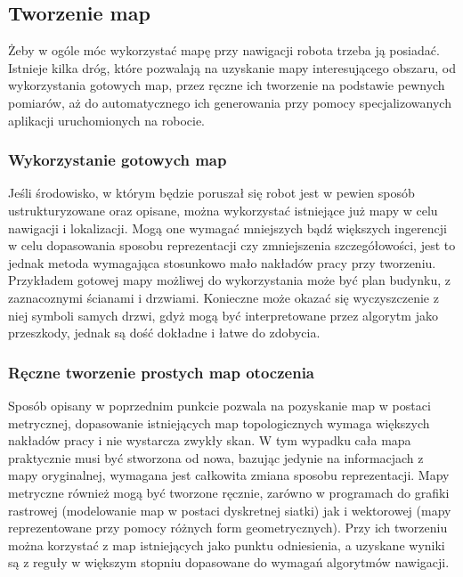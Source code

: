 \subsection{Tworzenie map}

Żeby w ogóle móc wykorzystać mapę przy nawigacji robota trzeba ją posiadać.
Istnieje kilka dróg, które pozwalają na uzyskanie mapy interesującego obszaru,
od wykorzystania gotowych map, przez ręczne ich tworzenie na podstawie pewnych
pomiarów, aż do automatycznego ich generowania przy pomocy specjalizowanych
aplikacji uruchomionych na robocie.

\subsubsection{Wykorzystanie gotowych map}

Jeśli środowisko, w którym będzie poruszał się robot jest w pewien sposób
ustrukturyzowane oraz opisane, można wykorzystać istniejące już mapy w celu
nawigacji i lokalizacji. Mogą one wymagać mniejszych bądź większych ingerencji
w celu dopasowania sposobu reprezentacji czy zmniejszenia szczegółowości,
jest to jednak metoda wymagająca stosunkowo mało nakładów pracy przy tworzeniu.
Przykładem gotowej mapy możliwej do wykorzystania może być plan budynku,
z zaznacoznymi ścianami i drzwiami. Konieczne może okazać się wyczyszczenie
z niej symboli samych drzwi, gdyż mogą być interpretowane przez algorytm
jako przeszkody, jednak są dość dokładne i łatwe do zdobycia.

\subsubsection{Ręczne tworzenie prostych map otoczenia}

Sposób opisany w poprzednim punkcie pozwala na pozyskanie map w postaci metrycznej,
dopasowanie istniejących map topologicznych wymaga większych nakładów pracy
i nie wystarcza zwykły skan. W tym wypadku cała mapa praktycznie musi być
stworzona od nowa, bazując jedynie na informacjach z mapy oryginalnej, wymagana
jest całkowita zmiana sposobu reprezentacji. Mapy metryczne również mogą być
tworzone ręcznie, zarówno w programach do grafiki rastrowej (modelowanie map
w postaci dyskretnej siatki) jak i wektorowej (mapy reprezentowane przy pomocy
różnych form geometrycznych). Przy ich tworzeniu można korzystać z map istniejących
jako punktu odniesienia, a uzyskane wyniki są z reguły w większym stopniu
dopasowane do wymagań algorytmów nawigacji.

